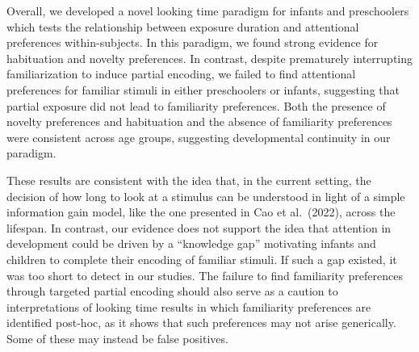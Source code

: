 \documentclass[10pt, letterpaper]{article}
\begin{document}
Overall, we developed a novel looking time paradigm for infants and
preschoolers which tests the relationship between exposure duration and
attentional preferences within-subjects. In this paradigm, we found
strong evidence for habituation and novelty preferences. In contrast,
despite prematurely interrupting familiarization to induce partial
encoding, we failed to find attentional preferences for familiar stimuli
in either preschoolers or infants, suggesting that partial exposure did
not lead to familiarity preferences. Both the presence of novelty
preferences and habituation and the absence of familiarity preferences
were consistent across age groups, suggesting developmental continuity
in our paradigm.

These results are consistent with the idea that, in the current setting,
the decision of how long to look at a stimulus can be understood in
light of a simple information gain model, like the one presented in Cao
et al.~(2022), across the lifespan. In contrast, our evidence does not
support the idea that attention in development could be driven by a
``knowledge gap'' motivating infants and children to complete their
encoding of familiar stimuli. If such a gap existed, it was too short to
detect in our studies. The failure to find familiarity preferences
through targeted partial encoding should also serve as a caution to
interpretations of looking time results in which familiarity preferences
are identified post-hoc, as it shows that such preferences may not arise
generically. Some of these may instead be false positives.
\end{document}
